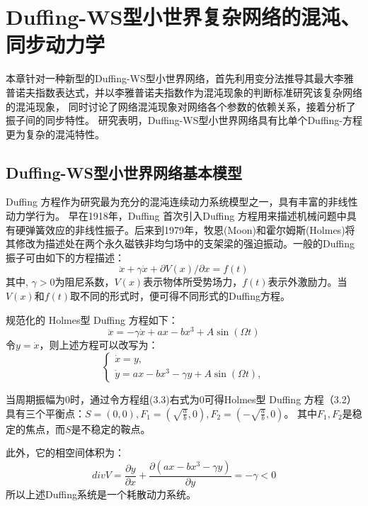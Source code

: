 \chapter{Duffing-WS型小世界复杂网络的混沌、同步动力学}
本章针对一种新型的Duffing-WS型小世界网络，首先利用变分法推导其最大李雅普诺夫指数表达式，并以李雅普诺夫指数作为混沌现象的判断标准研究该复杂网络的混沌现象，
同时讨论了网络混沌现象对网络各个参数的依赖关系，接着分析了振子间的同步特性。
研究表明，Duffing-WS型小世界网络具有比单个Duffing-方程更为复杂的混沌特性。
\section{Duffing-WS型小世界网络基本模型}

Duffing 方程作为研究最为充分的混沌连续动力系统模型之一，具有丰富的非线性动力学行为。
早在1918年，Duffing 首次引入Duffing 方程用来描述机械问题中具有硬弹簧效应的非线性振子。后来到1979年，牧恩(Moon)和霍尔姆斯(Holmes)将其修改为描述处在两个永久磁铁非均匀场中的支架梁的强迫振动。一般的Duffing 振子可由如下的方程描述：
\begin{equation}
    \ddot{x}+\gamma \dot{x}+\partial V(x)/\partial x = f(t)
\end{equation}
其中, $\gamma>0$为阻尼系数，$V(x)$表示物体所受势场力，$f(t)$表示外激励力。当$V(x)$和$f(t)$取不同的形式时，便可得不同形式的Duffing方程。

规范化的 Holmes型 Duffing 方程如下：
\begin{equation}
    \ddot{x}=-\gamma \dot{x}+a x-b x^{3}+A \sin (\Omega t)
\end{equation}
令$y=\dot{x}$，则上述方程可以改写为：
\begin{equation}
\left\{
  \begin{array}{ll}
    \dot{x}=y, \\
    \dot{y}=a x-b x^{3}-\gamma y+A \sin (\Omega t),
  \end{array}
\right.
\end{equation}

当周期振幅为0时，通过令方程组(3.3)右式为0可得Holmes型 Duffing 方程（3.2）具有三个平衡点：$S=(0,0),F_1=\left(\sqrt{\frac{a}{b}},0\right),F_2=\left(-\sqrt{\frac{a}{b}},0\right)$。
其中$F_1,F_2$是稳定的焦点，而$S$是不稳定的鞍点。

此外，它的相空间体积为：
\begin{equation}
div V = \frac{\partial y}{\partial x}+\frac{\partial(a x-b x^{3}-\gamma y)}{\partial y} = -\gamma <0
\end{equation}
所以上述Duffing系统是一个耗散动力系统。

